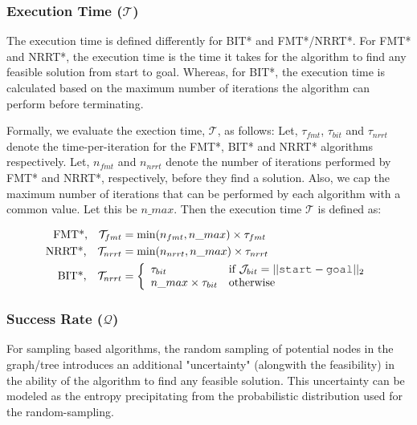 \documentclass{article}
\newcommand*{\varfont}{\fontfamily{pcr}\selectfont}
\begin{document}
\subsubsection{Execution Time ($\mathcal{T}$)}

The execution time is defined differently for BIT* and FMT*/NRRT*. For FMT* and NRRT*, the execution time is the time it takes for the algorithm to find any feasible solution from {\varfont start} to {\varfont goal}. Whereas, for BIT*, the execution time is calculated based on the maximum number of iterations the algorithm can perform before terminating.

Formally, we evaluate the exection time, $\mathcal{T}$,  as follows: Let, $\tau_{fmt}$, $\tau_{bit}$ and $\tau_{nrrt}$ denote the time-per-iteration for the FMT*, BIT* and NRRT* algorithms respectively. Let, $n_{fmt}$ and $n_{nrrt}$ denote the number of iterations performed by FMT* and NRRT*, respectively, before they find a solution. Also, we cap the maximum number of iterations that can be performed by each algorithm with a common value. Let this be $n\_max$. Then the execution time $\mathcal{T}$ is defined as:

\begin{align}
	\text{FMT*,} \quad \mathcal{T}_{fmt} &= \min(n_{fmt}, n\_max) \times \tau_{fmt} \\
	\text{NRRT*,} \quad \mathcal{T}_{nrrt} &= \min(n_{nrrt}, n\_max) \times \tau_{nrrt} \\
	\text{BIT*,} \quad \mathcal{T}_{nrrt} &= 
	\left\{
		\begin{array}{ll}
			\tau_{bit}  & \mbox{if } \mathcal{J}_{bit} = ||\text{\varfont start} - \text{\varfont goal}||_2\\
			n\_max \times \tau_{bit} & \mbox{otherwise} 
		\end{array}
	\right.
\end{align}

\subsubsection{Success Rate ($\mathcal{Q}$)}

For sampling based algorithms, the random sampling of potential nodes in the graph/tree introduces an additional "uncertainty" (alongwith the feasibility) in the ability of the algorithm to find any feasible solution. This uncertainty can be modeled as the entropy precipitating from the probabilistic distribution used for the random-sampling.
\end{document}
